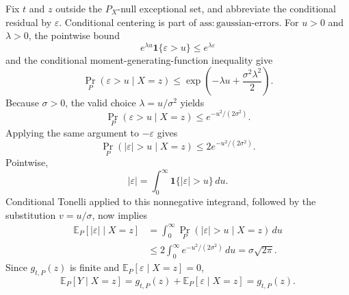 Fix \(t\) and \(z\) outside the \(P_X\)-null exceptional set, and abbreviate the conditional residual by \(\varepsilon\). Conditional centering is part of \(\mathrm{ass:gaussian\text{-}errors}\). For \(u>0\) and \(\lambda>0\), the pointwise bound
\[
 e^{\lambda u}\mathbf 1\{\varepsilon>u\}\le e^{\lambda\varepsilon}
\]
and the conditional moment-generating-function inequality give
\[
 \Pr_P(\varepsilon>u\mid X=z)
 \le\exp\!\left(-\lambda u+\frac{\sigma^2\lambda^2}{2}\right).
\]
Because \(\sigma>0\), the valid choice \(\lambda=u/\sigma^2\) yields
\[
 \Pr_P(\varepsilon>u\mid X=z)\le e^{-u^2/(2\sigma^2)}.
\]
Applying the same argument to \(-\varepsilon\) gives
\[
 \Pr_P(|\varepsilon|>u\mid X=z)\le2e^{-u^2/(2\sigma^2)}. \tag{15}
\]
Pointwise,
\[
 |\varepsilon|=\int_0^\infty\mathbf 1\{|\varepsilon|>u\}\,du.
\]
Conditional Tonelli applied to this nonnegative integrand, followed by the substitution \(v=u/\sigma\), now implies
\[
 \begin{aligned}
 \mathbb E_P[|\varepsilon|\mid X=z]
 &=\int_0^\infty\Pr_P(|\varepsilon|>u\mid X=z)\,du\\
 &\le2\int_0^\infty e^{-u^2/(2\sigma^2)}\,du
 =\sigma\sqrt{2\pi}.
 \end{aligned}\tag{16}
\]
Since \(g_{t,P}(z)\) is finite and \(\mathbb E_P[\varepsilon\mid X=z]=0\),
\[
 \mathbb E_P[Y\mid X=z]
 =g_{t,P}(z)+\mathbb E_P[\varepsilon\mid X=z]
 =g_{t,P}(z).
\]
